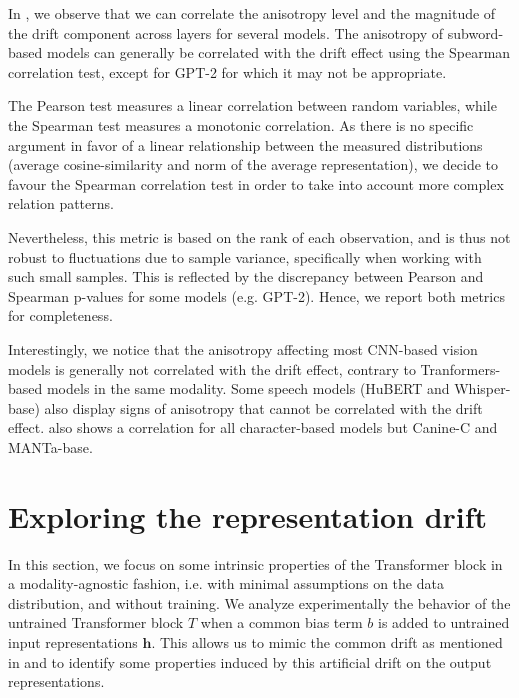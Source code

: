 In , we observe that we can correlate the anisotropy level and the magnitude of the drift component across layers for several models. The anisotropy of subword-based models can generally be correlated with the drift effect using the Spearman correlation test, except for GPT-2 for which it may not be appropriate.

The Pearson test measures a linear correlation between random variables, while the Spearman test measures a monotonic correlation. As there is no specific argument in favor of a linear relationship between the measured distributions (average cosine-similarity and norm of the average representation), we decide to favour the Spearman correlation test in order to take into account more complex relation patterns.

Nevertheless, this metric is based on the rank of each observation, and is thus not robust to fluctuations due to sample variance, specifically when working with such small samples. This is reflected by the discrepancy between Pearson and Spearman p-values for some models (e.g. GPT-2). Hence, we report both metrics for completeness.

Interestingly, we notice that the anisotropy affecting most CNN-based vision models is generally not correlated with the drift effect, contrary to Tranformers-based models in the same modality. Some speech models (HuBERT and Whisper-base) also display signs of anisotropy that cannot be correlated with the drift effect.  also shows a correlation for all character-based models but Canine-C and MANTa-base.

\section{Exploring the representation drift}
\label{sec:empirical}
In this section, we focus on some intrinsic properties of the Transformer block in a modality-agnostic fashion, i.e. with minimal assumptions on the data distribution, and without training. We analyze experimentally the behavior of the untrained Transformer block $T$ when a common bias term $b$ is added to untrained input representations $\mathbf{h}$. This allows us to mimic the common drift as mentioned in \citet{bis-etal-2021-much} and to identify some properties induced by this artificial drift on the output representations.


